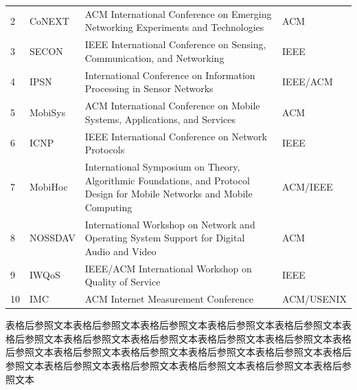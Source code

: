 \documentclass[doctor, vlined, ]{DissertUESTC}
\begin{document}
\begin{longtable}{p{2em} p{4.5em} p{20em} p{6em}}
		2 & CoNEXT & ACM International Conference on Emerging Networking Experiments and Technologies & ACM \\
		3 & SECON & IEEE International Conference on Sensing, Communication, and Networking & IEEE \\
		4 & IPSN & International Conference on Information Processing in Sensor Networks & IEEE/ACM \\
		5 & MobiSys & ACM International Conference on Mobile Systems, Applications, and Services & ACM \\
		6 & ICNP & IEEE International Conference on Network Protocols & IEEE\tablenoteref{tn: 手动跨页表格附注标签IEEE} \\
		7 & MobiHoc & International Symposium on Theory, Algorithmic Foundations, and Protocol Design for Mobile Networks and Mobile Computing & ACM/IEEE \\
		8 & NOSSDAV & International Workshop on Network and Operating System Support for Digital Audio and Video & ACM\tablenoteref{tn: 手动跨页表格附注标签ACM} \\
		9 & IWQoS & IEEE/ACM International Workshop on Quality of Service & IEEE \\
		10 & IMC & ACM Internet Measurement Conference & ACM/USENIX \\
		
		
	\end{longtable}

	表格后参照文本表格后参照文本表格后参照文本表格后参照文本表格后参照文本表格后参照文本表格后参照文本表格后参照文本表格后参照文本表格后参照文本表格后参照文本表格后参照文本表格后参照文本表格后参照文本表格后参照文本表格后参照文本表格后参照文本表格后参照文本表格后参照文本表格后参照文本表格后参照文本

	\newpage
\end{document}

